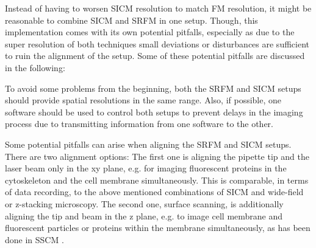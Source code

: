 %
%

Instead of having to worsen SICM resolution to match FM resolution, it might be 
reasonable to combine SICM and SRFM in one setup. Though, this implementation
comes with its own potential pitfalls, especially as due to the super resolution
of both techniques small deviations or disturbances are sufficient to ruin the 
alignment of the setup. Some of these potential pitfalls are discussed in the 
following:

To avoid some problems from the beginning, both the SRFM and SICM setups
should provide spatial resolutions in the same range. Also, if possible, one
software should be used to control both setups to prevent delays in the
imaging process due to transmitting information from one software to the other.

Some potential pitfalls can arise when aligning the SRFM and SICM
setups. There are two alignment options: The first one is aligning the pipette
tip and the laser beam only in the xy plane, e.g. for imaging fluorescent
proteins in the cytoskeleton and the cell membrane simultaneously. This is 
comparable, in terms of data recording, to the above mentioned combinations of
SICM and wide-field or z-stacking microscopy. 
The second one, surface scanning, is additionally aligning the tip and beam
in the z plane, e.g. to image cell membrane and fluorescent particles or proteins 
within the membrane simultaneously, as has been done in 
SSCM \cite{Gorelik2002a}\cite{Shevchuk2008}.

